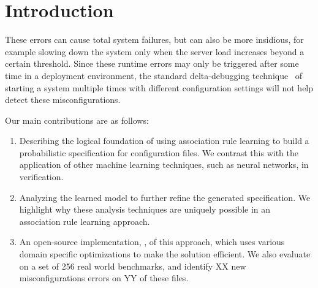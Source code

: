 \section{Introduction}
\label{sec-intro}

These errors can cause total system failures, but can also be more insidious, for example slowing down the system only when the server load increases beyond a certain threshold.
Since these runtime errors may only be triggered after some time in a deployment environment, the standard delta-debugging technique~\cite{x} of starting a system multiple times with different configuration settings will not help detect these misconfigurations.

Our main contributions are as follows:

\begin{enumerate}

\item Describing the logical foundation of using association rule learning to build a probabilistic specification for configuration files. 
      We contrast this with the application of other machine learning techniques, such as neural networks, in verification.

\item Analyzing the learned model to further refine the generated specification. 
      We highlight why these analysis techniques are uniquely possible in an association rule learning approach.

\item An open-source implementation, \app, of this approach, which uses various domain specific optimizations to make the solution efficient. 
      We also evaluate \app on a set of 256 real world benchmarks, and identify XX new misconfigurations errors on YY of these files.
\end{enumerate}


